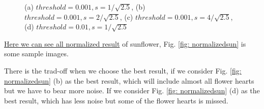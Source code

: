 \documentclass[final]{cvpr}
\begin{document}
\begin{appendices}
\begin{figure}[htbp]
  \caption{(a) $threshold=0.001, s=1/\sqrt{2.5}$, (b) $threshold=0.001, s=2/\sqrt{2.5}$, (c) $threshold=0.001, s=4/\sqrt{2.5}$, (d) $threshold=0.01, s=1/\sqrt{2.5}$}
  \label{fig: unnormalizedsun}
  \end{figure}

  \href{https://github.com/Arctic-Xiangjian/assignment2/tree/main/normalized2}{Here we can see all normalized result} of sunflower, Fig. \ref{fig: normalizedsun} is some sample images. 
  
  There is the trad-off when we choose the best result, if we consider Fig. \ref{fig: normalizedsun} (b) as the best result, which will include almost all flower hearts but we have to bear more noise. If we consider Fig. \ref{fig: normalizedsun} (d) as the best result, which has less noise but some of the flower hearts is missed.
  

\end{appendices}
\end{document}
